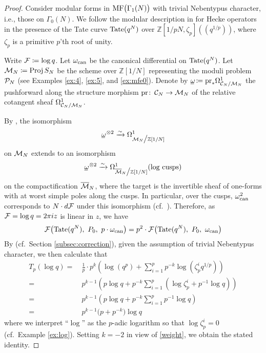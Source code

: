 \documentclass{gtpart}
\theoremstyle{definition}
\theoremstyle{remark}
\def\co{\colon\thinspace}
\newcommand{\mb}[1]{\mathbb{#1}}
\newcommand{\Proj}{{\rm Proj\thinspace}}
\newcommand{\CC}{{\cal C}}
\newcommand{\CF}{{\cal F}}
\newcommand{\CM}{{\cal M}}
\newcommand{\CMB}{\overline {\cal M}}
\newcommand{\CP}{{\cal P}}
\newcommand{\BZ}{{\mb Z}}
\newcommand{\can}{{\rm can}}
\newcommand{\MF}{{\rm MF}}
\newcommand{\G}{\Gamma}
\renewcommand{\o}{\omega}
\newcommand{\ou}{\underline{\omega\!}}
\newcommand{\ce}{\coloneqq}
\newcommand{\lp}{(\!(}
\newcommand{\rp}{)\!)}
\renewcommand{\=}{\approx}
\renewcommand{\-}{\sim}
\newcommand{\Tate}{{\rm Tate}}
\numberwithin{equation}{section}
\begin{document}
\begin{proof}
 Consider modular forms in $\MF\big(\G_1(N)\big)$ with trivial Nebentypus 
 character, i.e., those on $\G_0(N)$.  We follow the modular description in 
 \cite[Section 1.11]{padicprop} for Hecke operators in the presence of the Tate 
 curve $\Tate(q^N)$ over $\BZ [1/pN, \zeta_p] \lp q^{1/p} \rp$, where $\zeta_p$ 
 is a primitive $p$'th root of unity.  

 Write $\CF \ce \log q$.  Let $\o_\can$ be the canonical differential on 
 $\Tate(q^N)$.  Let $\CM_N \ce \Proj S_N$ be the scheme over $\BZ[1/N]$ 
 representing the moduli problem $\CP_N$ (see Examples \ref{ex:4}, \ref{ex:5}, 
 and \ref{ex:mfe0}).  Denote by $\ou \ce {\rm pr}_* \Omega^1_{\CC_N/\CM_N}$ the 
 pushforward along the structure morphism ${\rm pr} \co \CC_N \to \CM_N$ of the 
 relative cotangent sheaf $\Omega^1_{\CC_N/\CM_N}$.  

 By \cite[Theorem 10.13.11]{KM}, the isomorphism 
 \[
  \ou^{~\! \otimes 2} \xrightarrow{\sim} \Omega^1_{\CM_N \big/ \BZ[1/N]} 
 \]
 on $\CM_N$ extends to an isomorphism 
 \[
  \ou^{~\! \otimes 2} \xrightarrow{\sim} 
  \Omega^1_{\CMB_N \big/ \BZ[1/N]} (\text{log cusps}) 
 \]
 on the compactification $\CMB_N$, where the target is the invertible sheaf of 
 one-forms with at worst simple poles along the cusps.  In particular, over the 
 cusps, $\o_\can^2$ corresponds to $N \cdot d\CF$ under this isomorphism 
 (cf.~\cite[Section 1.5]{padicprop}).  Therefore, as $\CF = \log q = 2 \pi i z$ 
 is linear in $z$, we have 
 \begin{equation}
  \label{weight}
  \CF \big( \Tate(q^N), ~ P_0, ~ p \cdot \o_\can \big) = 
  p^2 \cdot \CF \big( \Tate(q^N), ~ P_0, ~ \o_\can \big) 
 \end{equation}
 By \cite[(1.11.0.3) and (1.11.0.4)]{padicprop} (cf.~Section 
 \ref{subsec:correction}), given the assumption of trivial Nebentypus character, 
 we then calculate that 
 \begin{equation}
  \label{Tplogq}
  \begin{split}
   T_p (\log q) = & ~ \frac{1}{p}\cdot p^k \left( \log(q^p) + \sum_{i = 1}^p 
                    p^{-k} \log(\zeta_p^i q^{1/p}) \right) \\
                = & ~ p^{k - 1} \left( p \log q + p^{-k} \sum_{i = 1}^p 
                    (\log \zeta_p^i + p^{-1} \log q) \right) \\
                = & ~ p^{k - 1} \left( p \log q + p^{-k} \sum_{i = 1}^p 
                    p^{-1} \log q \right) \\
                = & ~ p^{k - 1} \big( p + p^{-k} \big) \log q 
  \end{split}
 \end{equation}
 where we interpret ``$\log$'' as the $p$-adic logarithm so that 
 $\log \zeta_p^i = 0$ (cf.~Example \ref{ex:log}).  Setting $k = -2$ in view of 
 \eqref{weight}, we obtain the stated identity.  
\end{proof}
\end{document}
